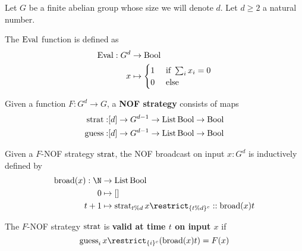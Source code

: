 
Let $G$ be a finite abelian group whose size we will denote $d$. Let $d \ge 2$ a natural number.

\begin{definition}
  \label{def:eval}
  \uses{}

  The $\operatorname{Eval}$ function is defined as
  \begin{align}
      \operatorname{Eval} : G^d & \to \operatorname{Bool} \\
      x & \mapsto \begin{cases}
      1 & \text{ if } \sum_i x_i = 0 \\
      0 & \text{ else}
    \end{cases}
  \end{align}
\end{definition}

\begin{definition}
  \label{def:strategy}
  \uses{}

  Given a function $F : G^d \to G$, a {\bf NOF strategy} consists of maps
  \begin{align}
    \operatorname{strat} : & [d] \to G^{d - 1} \to \operatorname{List} \operatorname{Bool} \to \operatorname{Bool} \\
    \operatorname{guess} : & [d] \to G^{d - 1} \to \operatorname{List} \operatorname{Bool} \to \operatorname{Bool}
  \end{align}
\end{definition}

\begin{definition}
  \label{def:broadcast}

  Given a $F$-NOF strategy $\operatorname{strat}$, the NOF broadcast on input $x : G^d$ is inductively defined by
  \begin{align}
    \broad(x) : \N & \to \List \Bool \\
    0 & \mapsto [] \\
    t + 1 & \mapsto \strat_{t \% d} x\restrict_{\{t \% d\}^c} :: \broad(x) t
  \end{align}
\end{definition}

\begin{definition}
  \label{def:valid-strategy}

  The $F$-NOF strategy $\operatorname{strat}$ is {\bf valid at time $t$ on input $x$} if
  $$\guess_i x\restrict_{\{i\}^c} (\broad(x) t) = F(x)$$
\end{definition}


